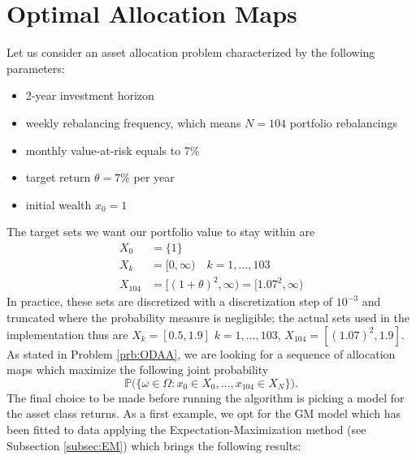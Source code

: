 \section{Optimal Allocation Maps}\label{sec:Allocation_Maps}
Let us consider an asset allocation problem characterized by the following parameters:
\begin{itemize}
	\item 2-year investment horizon
	\item weekly rebalancing frequency, which means $N=104$ portfolio rebalancings
	\item monthly value-at-risk equals to 7\%
	\item target return $\theta=7\%$ per year
	\item initial wealth $x_0 = 1$
\end{itemize}
The target sets we want our portfolio value to stay within are 
\begin{align*}
X_0 & = \{1\}\\
X_k & = [0,\infty) \quad k = 1,\ldots,103 \\
X_{104} & = [(1+\theta)^2,\infty) = [1.07^2,\infty)
\end{align*}
In practice, these sets are discretized with a discretization step of $10^{-3}$ and truncated where the probability measure is negligible; the actual sets used in the implementation thus are $X_k = [0.5,1.9]$ $k=1,\ldots,103$, $X_{104}=[(1.07)^2,1.9]$. As stated in Problem \ref{prb:ODAA}, we are looking for a sequence of allocation maps which maximize the following joint probability
\[ \mathbb{P}\big(\{\omega \in \Omega : x_0 \in X_0,\ldots,x_{104} \in X_N \} \big).\]
The final choice to be made before running the algorithm is picking a model for the asset class returns. As a first example, we opt for the GM model which has been fitted to data applying the Expectation-Maximization method (see Subsection \ref{subsec:EM}) which brings the following results:


